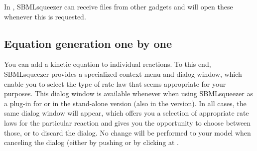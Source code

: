 In \Garuda, SBMLsqueezer can receive files from other gadgets and will open these whenever this is requested.

\subsection{Equation generation one by one}
\label{sec:EquationsOneByOne}

You can add a kinetic equation to individual reactions.
To this end, SBMLsqueezer provides a specialized context menu and dialog window, which enable you to select the type of rate law that seems appropriate for your purposes.
This dialog window is available whenever when using SBMLsqueezer as a plug-in for \CellDesigner or in the stand-alone version (also in the \Garuda version).
In all cases, the same dialog window will appear, which offers you a selection of appropriate rate laws for the particular reaction and gives you the opportunity to choose between those, or to discard the dialog.
No change will be performed to your model when canceling the dialog (either by pushing \keys{\escwin} or by clicking at .

